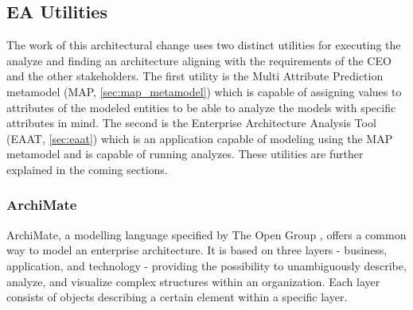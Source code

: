 \subsection{EA Utilities}
\label{sec:ea_utilities}
The work of this architectural change uses two distinct utilities for executing the analyze and finding an architecture aligning with the requirements of the CEO and the other stakeholders. The first utility is the Multi Attribute Prediction metamodel (MAP, \vref{sec:map_metamodel}) which is capable of assigning values to attributes of the modeled entities to be able to analyze the models with specific attributes in mind. The second is the Enterprise Architecture Analysis Tool (EAAT, \vref{sec:eaat}) which is an application capable of modeling using the MAP metamodel and is capable of running analyzes. These utilities are further explained in the coming sections.
\subsubsection{ArchiMate}
\label{sec:archimate}
ArchiMate, a modelling language specified by The Open Group \cite{archi}, offers a common way to model an enterprise architecture. It is based on three layers - business, application, and technology - providing the possibility to unambiguously describe, analyze, and visualize complex structures within an organization. Each layer consists of objects describing a certain element within a specific layer.

